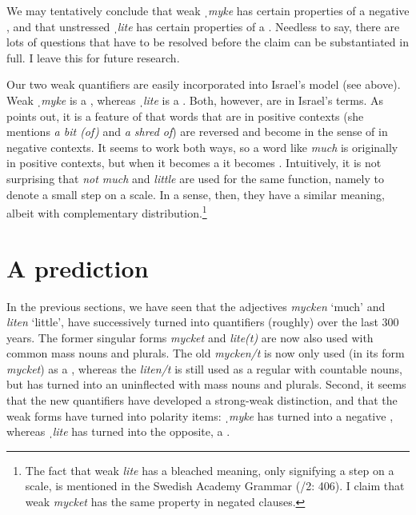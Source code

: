 \documentclass[output=paper]{langscibook}
\begin{document}
We may tentatively conclude that weak \textit{ˌmyke} has certain properties of a negative , and that unstressed \textit{ˌlite} has certain properties of a . Needless to say, there are lots of questions that have to be resolved before the claim can be substantiated in full. I leave this for future research.



Our two weak quantifiers are easily incorporated into Israel’s model (see  above). Weak \textit{ˌmyke} is a  , whereas \textit{ˌlite} is a  . Both, however, are  in Israel’s terms. As \citet[51]{Traugott2010} points out, it is a feature of  that words that are  in positive contexts (she mentions \textit{a bit (of)} and \textit{a shred of}) are reversed and become  in the sense of \citet{Israel1996} in negative contexts. It seems to work both ways, so a word like \textit{much} is originally  in positive contexts, but when it becomes a  it becomes . Intuitively, it is not surprising that \textit{not much} and \textit{little} are used for the same function, namely to denote a small step on a scale. In a sense, then, they have a similar meaning, albeit with complementary distribution.\footnote{The fact that weak \textit{lite} has a bleached meaning, only signifying a step on a scale, is mentioned in the Swedish Academy Grammar (\citealt{TelemanEtAl1999}/2: 406). I claim that weak \textit{mycket} has the same property in negated clauses.}


\section{A prediction}\label{sec:delsing:6}


In the previous sections, we have seen that the adjectives \textit{mycken} ‘much’ and \textit{liten} ‘little’, have successively turned into quantifiers (roughly) over the last 300 years. The former  singular forms \textit{mycket} and \textit{lite(t)} are now also used with common  mass nouns and plurals. The old  \textit{mycken/t} is now only used (in its  form \textit{mycket}) as a , whereas the  \textit{liten/t} is still used as a regular  with countable nouns, but has turned into an uninflected  with mass nouns and plurals. Second, it seems that the new quantifiers have developed a strong-weak distinction, and that the weak forms have turned into polarity items: \textit{ˌmyke} has turned into a negative , whereas \textit{ˌlite} has turned into the opposite, a .
\end{document}
